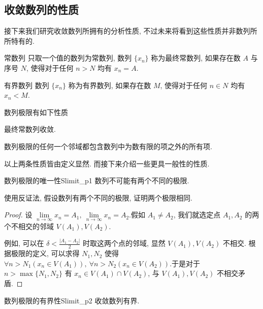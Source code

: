 \documentclass[cn,toc=twocol]{elegantbook}
\begin{document}
\subsection{收敛数列的性质}
接下来我们研究收敛数列所拥有的分析性质, 不过未来将看到这些性质并非数列所所特有的. 

\begin{definition}{常数列}
	只取一个值的数列为常数列, 数列 $\{x_n\}$ 称为最终常数列, 如果存在数 $A$ 与序号 $N$, 使得对于任何 $n > N$ 均有 $x_n = A$.
\end{definition}

\begin{definition}{有界数列}
	数列 $\{x_n\}$ 称为有界数列, 如果存在数 $M$, 使得对于任何 $n \in N$ 均有 $x_n < M$.
\end{definition}

数列极限有如下性质

\begin{theorem}
最终常数列收敛.
\end{theorem}

\begin{theorem}
数列极限的任何一个邻域都包含数列中为数有限的项之外的所有项.
\end{theorem}

以上两条性质皆由定义显然. 而接下来介绍一些更具一般性的性质.

\begin{theorem}{数列极限的唯一性}{Slimit_p1}
数列不可能有两个不同的极限.
\end{theorem}
\begin{idea*}
使用反证法, 假设数列有两个不同的极限, 证明两个极限相同.
\end{idea*}

\begin{proof}
	设 $\lim\limits_{n\to\infty} x_n = A_1 , \ \lim\limits_{n\to\infty} x_n = A_2$.假如 $A_1 \neq A_2$, 我们就选定点 $A_1, A_2$ 的两个不相交的邻域 $V(A_1), V(A_2)$.
	
	例如, 可以在 $\delta < \frac{\lvert A_1 - A_2\rvert}{2}$ 时取这两个点的邻域, 显然 $V(A_1), V(A_2)$ 不相交. 根据极限的定义, 可以求得 $N_1, N_2$ 使得 $\forall n > N_1 (x_n\in V(A_1)), \ \forall n > N_2 (x_n\in V(A_2))$.于是对于 $n > \max\{N_1, N_2\}$ 有 $x_n \in V(A_1) \cap V(A_2)$, 与 $V(A_1), V(A_2)$ 不相交矛盾.
\end{proof}
\smallskip

\begin{theorem}{数列极限的有界性}{Slimit_p2}
收敛数列有界.
\end{theorem}
\end{document}
